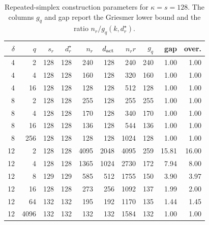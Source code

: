 \begin{table}
\centering
\small
\caption{Repeated-simplex construction parameters for $\kappa=s=128$. The columns $g_q$ and gap report the Griesmer lower bound and the ratio $n_r/g_q(k,d^\star_r)$.}
\label{tab:params}
\begin{tabular}{rrrrrrrrrr}
\toprule
$\delta$ & $q$ & $s_r$ & $d^\star_r$ & $n_r$ & $d_{\rm act}$ & $n_r r$ & $g_q$ & gap & over. \\
\midrule
4 & 2 & 128 & 128 & 240 & 128 & 240 & 240 & 1.00 & 1.00 \\
4 & 4 & 128 & 128 & 160 & 128 & 320 & 160 & 1.00 & 1.00 \\
4 & 16 & 128 & 128 & 128 & 128 & 512 & 128 & 1.00 & 1.00 \\
8 & 2 & 128 & 128 & 255 & 128 & 255 & 255 & 1.00 & 1.00 \\
8 & 4 & 128 & 128 & 170 & 128 & 340 & 170 & 1.00 & 1.00 \\
8 & 16 & 128 & 128 & 136 & 128 & 544 & 136 & 1.00 & 1.00 \\
8 & 256 & 128 & 128 & 128 & 128 & 1024 & 128 & 1.00 & 1.00 \\
12 & 2 & 128 & 128 & 4095 & 2048 & 4095 & 259 & 15.81 & 16.00 \\
12 & 4 & 128 & 128 & 1365 & 1024 & 2730 & 172 & 7.94 & 8.00 \\
12 & 8 & 129 & 129 & 585 & 512 & 1755 & 150 & 3.90 & 3.97 \\
12 & 16 & 128 & 128 & 273 & 256 & 1092 & 137 & 1.99 & 2.00 \\
12 & 64 & 132 & 132 & 195 & 192 & 1170 & 135 & 1.44 & 1.45 \\
12 & 4096 & 132 & 132 & 132 & 132 & 1584 & 132 & 1.00 & 1.00 \\
\bottomrule
\end{tabular}
\end{table}
